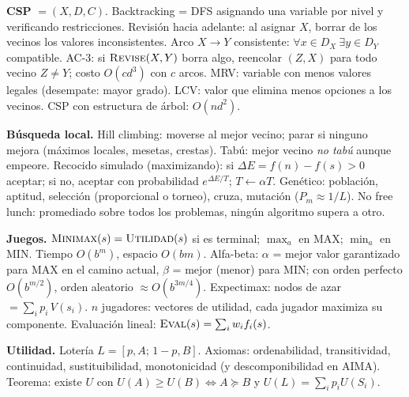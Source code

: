 \begin{formulario}
\textbf{CSP} $=(X,D,C)$. Backtracking = DFS asignando una variable por nivel y verificando
restricciones. Revisión hacia adelante: al asignar $X$, borrar de los vecinos los valores
inconsistentes. Arco $X\to Y$ consistente: $\forall x\in D_X\ \exists y\in D_Y$ compatible.
AC-3: si $\textsc{Revise}(X,Y)$ borra algo, reencolar $(Z,X)$ para todo vecino $Z\ne Y$;
costo $O(cd^3)$ con $c$ arcos. MRV: variable con menos valores legales (desempate: mayor grado).
LCV: valor que elimina menos opciones a los vecinos. CSP con estructura de árbol: $O(nd^2)$.
\end{formulario}

\begin{formulario}
\textbf{Búsqueda local.} Hill climbing: moverse al mejor vecino; parar si ninguno mejora
(máximos locales, mesetas, crestas). Tabú: mejor vecino \emph{no tabú} aunque empeore.
Recocido simulado (maximizando): si $\Delta E=f(n)-f(s)>0$ aceptar; si no, aceptar con
probabilidad $e^{\Delta E/T}$; $T\leftarrow\alpha T$. Genético: población, aptitud, selección
(proporcional o torneo), cruza, mutación ($P_m\approx 1/L$). No free lunch: promediado sobre
todos los problemas, ningún algoritmo supera a otro.
\end{formulario}

\begin{formulario}
\textbf{Juegos.} $\textsc{Minimax}(s)=\textsc{Utilidad}(s)$ si es terminal; $\max_a$ en MAX; $\min_a$
en MIN. Tiempo $O(b^m)$, espacio $O(bm)$. Alfa-beta: $\alpha$ = mejor valor garantizado para MAX
en el camino actual, $\beta$ = mejor (menor) para MIN; con orden perfecto $O(b^{m/2})$, orden
aleatorio $\approx O(b^{3m/4})$. Expectimax: nodos de azar $=\sum_i p_i\,V(s_i)$. $n$ jugadores:
vectores de utilidad, cada jugador maximiza su componente. Evaluación lineal:
$\textsc{Eval}(s)=\sum_i w_i f_i(s)$.

\textbf{Utilidad.} Lotería $L=[p,A;\,1-p,B]$. Axiomas: ordenabilidad, transitividad,
continuidad, sustituibilidad, monotonicidad (y descomponibilidad en AIMA).
Teorema: existe $U$ con $U(A)\ge U(B)\iff A\succeq B$ y $U(L)=\sum_i p_iU(S_i)$.
\end{formulario}

